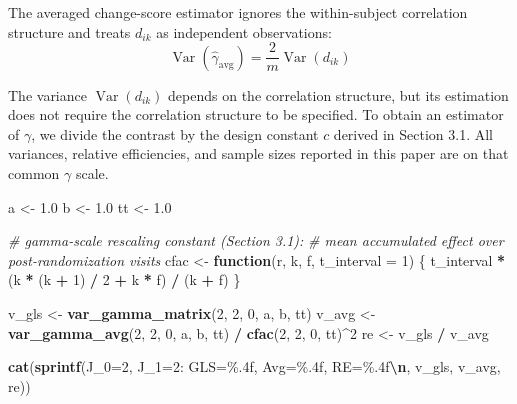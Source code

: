 \documentclass[
  11pt,
]{article}
\newenvironment{Shaded}{\begin{snugshade}}{\end{snugshade}}
\newcommand{\AttributeTok}[1]{\textcolor[rgb]{0.13,0.29,0.53}{#1}}
\newcommand{\CommentTok}[1]{\textcolor[rgb]{0.56,0.35,0.01}{\textit{#1}}}
\newcommand{\ControlFlowTok}[1]{\textcolor[rgb]{0.13,0.29,0.53}{\textbf{#1}}}
\newcommand{\DecValTok}[1]{\textcolor[rgb]{0.00,0.00,0.81}{#1}}
\newcommand{\FloatTok}[1]{\textcolor[rgb]{0.00,0.00,0.81}{#1}}
\newcommand{\FunctionTok}[1]{\textcolor[rgb]{0.13,0.29,0.53}{\textbf{#1}}}
\newcommand{\NormalTok}[1]{#1}
\newcommand{\OtherTok}[1]{\textcolor[rgb]{0.56,0.35,0.01}{#1}}
\newcommand{\SpecialCharTok}[1]{\textcolor[rgb]{0.81,0.36,0.00}{\textbf{#1}}}
\newcommand{\StringTok}[1]{\textcolor[rgb]{0.31,0.60,0.02}{#1}}
\begin{document}
The averaged change-score estimator ignores the
within-subject correlation structure and treats
\(d_{ik}\) as independent observations:
\begin{equation}
  \mathop{\mathrm{Var}}(\hat\gamma_{\text{avg}})
  = \frac{2}{m}\mathop{\mathrm{Var}}(d_{ik})
\end{equation}

The variance \(\mathop{\mathrm{Var}}(d_{ik})\) depends on the correlation
structure, but its estimation does not require the
correlation structure to be specified. To obtain an
estimator of \(\gamma\), we divide the contrast by the
design constant \(c\) derived in Section 3.1. All
variances, relative efficiencies, and sample sizes
reported in this paper are on that common \(\gamma\)
scale.

\begin{Shaded}
\begin{Highlighting}[]
\NormalTok{a }\OtherTok{\textless{}{-}} \FloatTok{1.0}
\NormalTok{b }\OtherTok{\textless{}{-}} \FloatTok{1.0}
\NormalTok{tt }\OtherTok{\textless{}{-}} \FloatTok{1.0}

\CommentTok{\# gamma{-}scale rescaling constant (Section 3.1):}
\CommentTok{\# mean accumulated effect over post{-}randomization visits}
\NormalTok{cfac }\OtherTok{\textless{}{-}} \ControlFlowTok{function}\NormalTok{(r, k, f, }\AttributeTok{t\_interval =} \DecValTok{1}\NormalTok{) \{}
\NormalTok{  t\_interval }\SpecialCharTok{*}\NormalTok{ (k }\SpecialCharTok{*}\NormalTok{ (k }\SpecialCharTok{+} \DecValTok{1}\NormalTok{) }\SpecialCharTok{/} \DecValTok{2} \SpecialCharTok{+}\NormalTok{ k }\SpecialCharTok{*}\NormalTok{ f) }\SpecialCharTok{/}\NormalTok{ (k }\SpecialCharTok{+}\NormalTok{ f)}
\NormalTok{\}}

\NormalTok{v\_gls }\OtherTok{\textless{}{-}} \FunctionTok{var\_gamma\_matrix}\NormalTok{(}\DecValTok{2}\NormalTok{, }\DecValTok{2}\NormalTok{, }\DecValTok{0}\NormalTok{, a, b, tt)}
\NormalTok{v\_avg }\OtherTok{\textless{}{-}} \FunctionTok{var\_gamma\_avg}\NormalTok{(}\DecValTok{2}\NormalTok{, }\DecValTok{2}\NormalTok{, }\DecValTok{0}\NormalTok{, a, b, tt) }\SpecialCharTok{/}
  \FunctionTok{cfac}\NormalTok{(}\DecValTok{2}\NormalTok{, }\DecValTok{2}\NormalTok{, }\DecValTok{0}\NormalTok{, tt)}\SpecialCharTok{\^{}}\DecValTok{2}
\NormalTok{re }\OtherTok{\textless{}{-}}\NormalTok{ v\_gls }\SpecialCharTok{/}\NormalTok{ v\_avg}

\FunctionTok{cat}\NormalTok{(}\FunctionTok{sprintf}\NormalTok{(}\StringTok{\textquotesingle{}J\_0=2, J\_1=2: GLS=\%.4f, Avg=\%.4f, RE=\%.4f}\SpecialCharTok{\textbackslash{}n}\StringTok{\textquotesingle{}}\NormalTok{,}
\NormalTok{            v\_gls, v\_avg, re))}
\end{Highlighting}
\end{Shaded}
\end{document}
